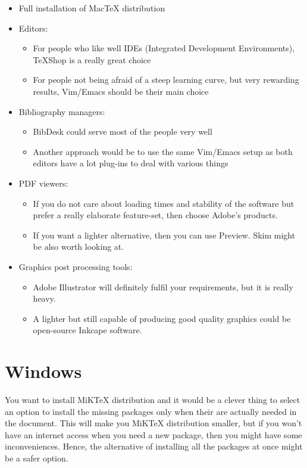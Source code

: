 \documentclass[a4paper]{article}
\begin{document}
\begin{itemize}
    \item Full installation of MacTeX distribution
    \item Editors:
        \begin{itemize}
            \item For people who like well IDEs (Integrated Development
                Environments), TeXShop is a really great choice
            \item For people not being afraid of a steep learning curve, but
                very rewarding results, Vim/Emacs should be their main choice
        \end{itemize}
    \item Bibliography managers:
        \begin{itemize}
            \item BibDesk could serve most of the people very well
            \item Another approach would be to use the same Vim/Emacs setup as
                both editors have a lot plug-ins to deal with various things
        \end{itemize}
    \item PDF viewers:
        \begin{itemize}
            \item If you do not care about loading times and stability of the
                software but prefer a really elaborate feature-set, then choose
                Adobe's products.
            \item If you want a lighter alternative, then you can use Preview.
                Skim might be also worth looking at.
        \end{itemize}
    \item Graphics post processing tools:
        \begin{itemize}
            \item Adobe Illustrator will definitely fulfil your requirements,
                but it is really heavy.
            \item A lighter but still capable of producing good quality graphics
                could be open-source Inkcape software.
        \end{itemize}
\end{itemize}

\section{Windows}

You want to install MiKTeX distribution and it would be a clever thing to select
an option to install the missing packages only when their are actually needed in
the document. This will make you MiKTeX distribution smaller, but if you won't
have an internet access when you need a new package, then you might have some
inconveniences. Hence, the alternative of installing all the packages at once
might be a safer option.
\end{document}
